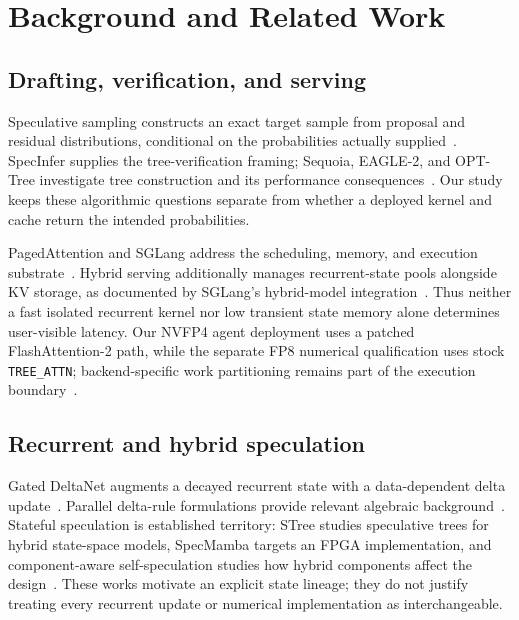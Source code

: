 \documentclass[conference]{IEEEtran}
\begin{document}
\section{Background and Related Work}
\label{sec:related}
\subsection{Drafting, verification, and serving}
Speculative sampling constructs an exact target sample from proposal and residual distributions, conditional on the probabilities actually supplied~\cite{leviathan2023fast,chen2023sampling}. SpecInfer supplies the tree-verification framing; Sequoia, EAGLE-2, and OPT-Tree investigate tree construction and its performance consequences~\cite{miao2023specinfer,chen2024sequoia,li2024eagle,wang2024opt}. Our study keeps these algorithmic questions separate from whether a deployed kernel and cache return the intended probabilities.

PagedAttention and SGLang address the scheduling, memory, and execution substrate~\cite{kwon2023efficient,zheng2024sglang}. Hybrid serving additionally manages recurrent-state pools alongside KV storage, as documented by SGLang's hybrid-model integration~\cite{pytorch2025sglang,sglang2026qwen}. Thus neither a fast isolated recurrent kernel nor low transient state memory alone determines user-visible latency. Our NVFP4 agent deployment uses a patched FlashAttention-2 path, while the separate FP8 numerical qualification uses stock \texttt{TREE\_ATTN}; backend-specific work partitioning remains part of the execution boundary~\cite{dao2023flashattention,lumo2026archive}.

\subsection{Recurrent and hybrid speculation}
Gated DeltaNet augments a decayed recurrent state with a data-dependent delta update~\cite{yang2024gated}. Parallel delta-rule formulations provide relevant algebraic background~\cite{yang2024delta}. Stateful speculation is established territory: STree studies speculative trees for hybrid state-space models, SpecMamba targets an FPGA implementation, and component-aware self-speculation studies how hybrid components affect the design~\cite{wu2025stree,zhong2025specmamba,borobia2026component}. These works motivate an explicit state lineage; they do not justify treating every recurrent update or numerical implementation as interchangeable.
\end{document}
